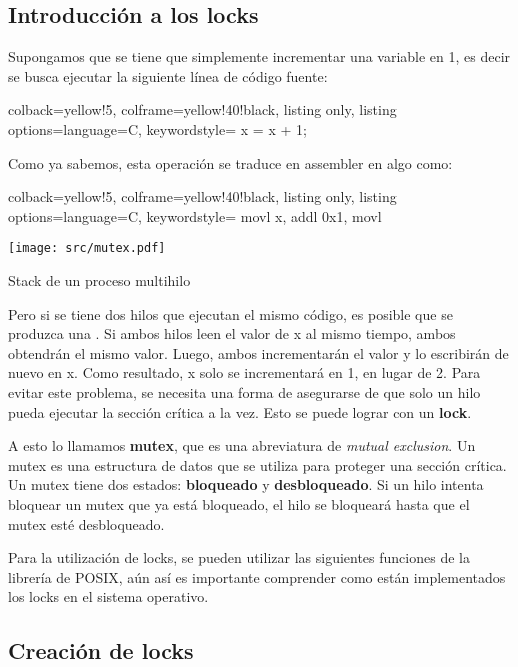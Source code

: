 \documentclass[openany]{book}
\begin{document}
\subsection{Introducción a los locks}
Supongamos que se tiene que simplemente incrementar una variable en 1, es decir se busca ejecutar la siguiente línea de código fuente:

\begin{tcblisting}{colback=yellow!5, colframe=yellow!40!black, listing only, listing options={language=C, keywordstyle=\color{blue!35!white}\bfseries}}
x = x + 1;
\end{tcblisting}

Como ya sabemos, esta operación se traduce en assembler en algo como:

\begin{tcblisting}{colback=yellow!5, colframe=yellow!40!black, listing only, listing options={language=C, keywordstyle=\color{blue!35!white}\bfseries}}
movl x, %
addl 0x1, %
movl %
\end{tcblisting}

\newpage
\begin{floatingfigure}[l]{0.4\textwidth}
    \texttt{[image: src/mutex.pdf]}
    \caption{Stack de un proceso multihilo}
\end{floatingfigure}
Pero si se tiene dos hilos que ejecutan el mismo código, es posible que se produzca una . Si ambos hilos leen el valor de x al mismo tiempo, ambos obtendrán el mismo valor. Luego, ambos incrementarán el valor y lo escribirán de nuevo en x. Como resultado, x solo se incrementará en 1, en lugar de 2. Para evitar este problema, se necesita una forma de asegurarse de que solo un hilo pueda ejecutar la sección crítica a la vez. Esto se puede lograr con un \textbf{lock}.

A esto lo llamamos \textbf{mutex}, que es una abreviatura de \textit{mutual exclusion}. Un mutex es una estructura de datos que se utiliza para proteger una sección crítica. Un mutex tiene dos estados: \textbf{bloqueado} y \textbf{desbloqueado}. Si un hilo intenta bloquear un mutex que ya está bloqueado, el hilo se bloqueará hasta que el mutex esté desbloqueado.

Para la utilización de locks, se pueden utilizar las siguientes funciones de la librería de POSIX, aún así es importante comprender como están implementados los locks en el sistema operativo.

\subsection{Creación de locks}
\end{document}
